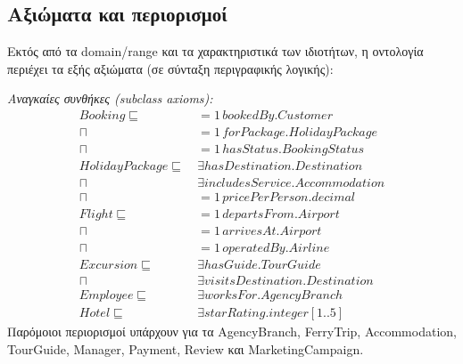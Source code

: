 \documentclass[conference]{IEEEtran}
\newcommand{\cls}[1]{\textsf{#1}}          %
\begin{document}
\subsection{Αξιώματα και περιορισμοί}

Εκτός από τα domain/range και τα χαρακτηριστικά των ιδιοτήτων, η οντολογία
περιέχει τα εξής αξιώματα (σε σύνταξη περιγραφικής λογικής):

\noindent\textit{Αναγκαίες συνθήκες (subclass axioms):}
{\footnotesize
\begin{align*}
\mathit{Booking} \sqsubseteq\ & {=}1\,\mathit{bookedBy}.\mathit{Customer}\\
 \sqcap\ & {=}1\,\mathit{forPackage}.\mathit{HolidayPackage}\\
 \sqcap\ & {=}1\,\mathit{hasStatus}.\mathit{BookingStatus}\\
\mathit{HolidayPackage} \sqsubseteq\ & \exists\mathit{hasDestination}.\mathit{Destination}\\
 \sqcap\ & \exists\mathit{includesService}.\mathit{Accommodation}\\
 \sqcap\ & {=}1\,\mathit{pricePerPerson}.\mathit{decimal}\\
\mathit{Flight} \sqsubseteq\ & {=}1\,\mathit{departsFrom}.\mathit{Airport}\\
 \sqcap\ & {=}1\,\mathit{arrivesAt}.\mathit{Airport}\\
 \sqcap\ & {=}1\,\mathit{operatedBy}.\mathit{Airline}\\
\mathit{Excursion} \sqsubseteq\ & \exists\mathit{hasGuide}.\mathit{TourGuide}\\
 \sqcap\ & \exists\mathit{visitsDestination}.\mathit{Destination}\\
\mathit{Employee} \sqsubseteq\ & \exists\mathit{worksFor}.\mathit{AgencyBranch}\\
\mathit{Hotel} \sqsubseteq\ & \exists\mathit{starRating}.\mathit{integer}[1..5]
\end{align*}}
Παρόμοιοι περιορισμοί υπάρχουν για τα \cls{AgencyBranch}, \cls{FerryTrip},
\cls{Accommodation}, \cls{TourGuide}, \cls{Manager}, \cls{Payment}, \cls{Review} και
\cls{MarketingCampaign}.
\end{document}
